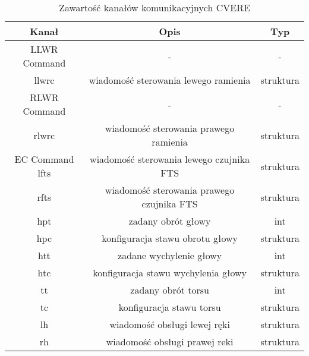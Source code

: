 \documentclass[]{article}
\begin{document}
\begin{table}[H]
	\begin{tabular}{||c|cc||}
		\hline
		Kanał & Opis & Typ \\
		\hline\hline
		LLWR Command & - & - \\
		llwrc & wiadomość sterowania lewego ramienia & struktura \\
		RLWR Command & - & - \\
		rlwrc & wiadomość sterowania prawego ramienia & struktura \\
		EC Command
		lfts & wiadomość sterowania lewego czujnika FTS & struktura \\
		rfts & wiadomość sterowania prawego czujnika FTS & struktura \\
		hpt & zadany obrót głowy & int \\
		hpc & konfiguracja stawu obrotu głowy & struktura \\
		htt & zadane wychylenie głowy & int \\
		htc & konfiguracja stawu wychylenia głowy & struktura \\
		tt & zadany obrót torsu & int \\
		tc & konfiguracja stawu torsu & struktura \\
		lh & wiadomość obsługi lewej ręki & struktura \\
		rh & wiadomość obsługi prawej reki & struktura \\
		\hline
	\end{tabular}
	\caption{Zawartość kanałów komunikacyjnych CVERE}
\end{table}
\end{document}
